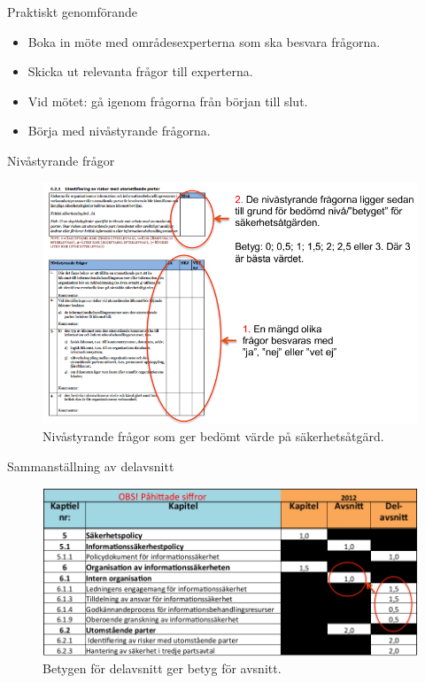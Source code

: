 \documentclass{beamer}
\begin{document}
\begin{frame}{Praktiskt genomförande}
  \begin{itemize}
    \item Boka in möte med områdesexperterna som ska besvara frågorna.
    \item Skicka ut relevanta frågor till experterna.
    \item Vid mötet: gå igenom frågorna från början till slut.
    \item Börja med nivåstyrande frågorna.
  \end{itemize}
\end{frame}

\begin{frame}{Nivåstyrande frågor}
  \begin{figure}
    \includegraphics[height=0.7\textheight]{gap-nivafragor.png}
    \caption{Nivåstyrande frågor som ger bedömt värde på säkerhetsåtgärd.}
  \end{figure}
\end{frame}

\begin{frame}{Sammanställning av delavsnitt}
  \begin{figure}
    \includegraphics[width=\textwidth]{gap-sammanstallning.png}
    \caption{Betygen för delavsnitt ger betyg för avsnitt.}
  \end{figure}
\end{frame}
\end{document}
